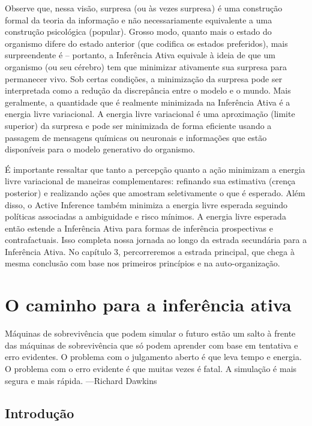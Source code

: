 \documentclass[
  12pt,
]{book}
\begin{document}
Observe que, nessa visão, surpresa (ou às vezes surpresa ) é uma construção formal da teoria da informação e não necessariamente equivalente a uma construção psicológica (popular). Grosso modo, quanto mais o estado do organismo difere do estado anterior (que codifica os estados preferidos), mais surpreendente é -- portanto, a Inferência Ativa equivale à ideia de que um organismo (ou seu cérebro) tem que minimizar ativamente sua surpresa para permanecer vivo. Sob certas condições, a minimização da surpresa pode ser interpretada como a redução da discrepância entre o modelo e o mundo. Mais geralmente, a quantidade que é realmente minimizada na Inferência Ativa é a energia livre variacional. A energia livre variacional é uma aproximação (limite superior) da surpresa e pode ser minimizada de forma eficiente usando a passagem de mensagens químicas ou neuronais e informações que estão disponíveis para o modelo generativo do organismo.

É importante ressaltar que tanto a percepção quanto a ação minimizam a energia livre variacional de maneiras complementares: refinando sua estimativa (crença posterior ) e realizando ações que amostram seletivamente o que é esperado. Além disso, o Active Inference também minimiza a energia livre esperada seguindo políticas associadas a ambiguidade e risco mínimos. A energia livre esperada então estende a Inferência Ativa para formas de inferência prospectivas e contrafactuais. Isso completa nossa jornada ao longo da estrada secundária para a Inferência Ativa. No capítulo 3, percorreremos a estrada principal, que chega à mesma conclusão com base nos primeiros princípios e na auto-organização.

\hypertarget{o-caminho-para-a-inferuxeancia-ativa}{%
\chapter{O caminho para a inferência ativa}\label{o-caminho-para-a-inferuxeancia-ativa}}

Máquinas de sobrevivência que podem simular o futuro estão um salto à frente das máquinas de sobrevivência que só podem aprender com base em tentativa e erro evidentes. O problema com o julgamento aberto é que leva tempo e energia. O problema com o erro evidente é que muitas vezes é fatal. A simulação é mais segura e mais rápida.
---Richard Dawkins

\hypertarget{introduuxe7uxe3o-2}{%
\section{Introdução}\label{introduuxe7uxe3o-2}}
\end{document}
